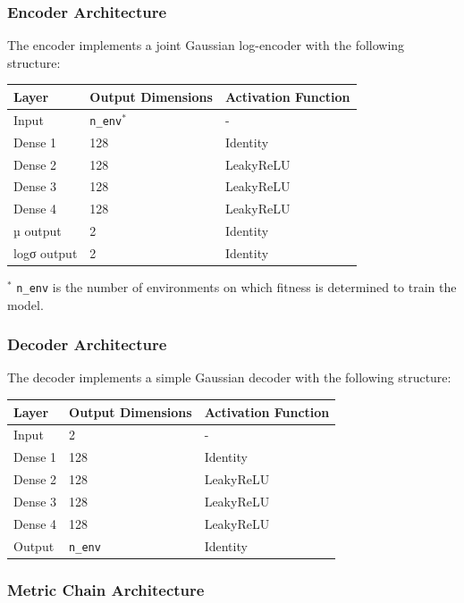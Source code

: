 \documentclass[
]{scrartcl}
\begin{document}
\begin{refsection}
\subsubsection{Encoder Architecture}\label{encoder-architecture}

The encoder implements a joint Gaussian log-encoder with the following
structure:

\begin{longtable}[]{@{}lll@{}}
\toprule\noalign{}
Layer & Output Dimensions & Activation Function \\
\midrule\noalign{}
\endhead
\bottomrule\noalign{}
\endlastfoot
Input & \texttt{n\_env}\(^*\) & - \\
Dense 1 & 128 & Identity \\
Dense 2 & 128 & LeakyReLU \\
Dense 3 & 128 & LeakyReLU \\
Dense 4 & 128 & LeakyReLU \\
µ output & 2 & Identity \\
logσ output & 2 & Identity \\
\end{longtable}

\(^*\) \texttt{n\_env} is the number of environments on which fitness is
determined to train the model.

\subsubsection{Decoder Architecture}\label{decoder-architecture}

The decoder implements a simple Gaussian decoder with the following
structure:

\begin{longtable}[]{@{}lll@{}}
\toprule\noalign{}
Layer & Output Dimensions & Activation Function \\
\midrule\noalign{}
\endhead
\bottomrule\noalign{}
\endlastfoot
Input & 2 & - \\
Dense 1 & 128 & Identity \\
Dense 2 & 128 & LeakyReLU \\
Dense 3 & 128 & LeakyReLU \\
Dense 4 & 128 & LeakyReLU \\
Output & \texttt{n\_env} & Identity \\
\end{longtable}

\subsubsection{Metric Chain
Architecture}\label{metric-chain-architecture}


\end{refsection}
\end{document}
